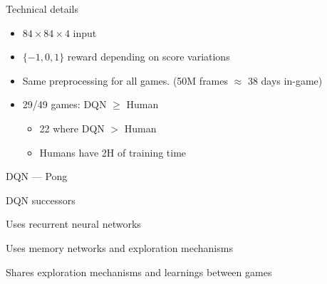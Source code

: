 \begin{frame}{Technical details}
  \begin{itemize}
  \item $84 \times 84 \times 4$ input
  \item $\{-1, 0, 1\}$ reward depending on score variations
  \item Same preprocessing for all games. (50M frames $\approx$ 38 days in-game)
  \item 29/49 games: DQN $\geq$ Human
    \begin{itemize}
    \item 22 where DQN $>$ Human
    \item Humans have 2H of training time
    \end{itemize}
  \end{itemize}
\end{frame}

\begin{frame}{DQN --- Pong}
\end{frame}

\begin{frame}{DQN successors}
  \begin{description}[<+->]
    \item[R2D2] Uses recurrent neural networks
    \item[Never Give Up] Uses memory networks and exploration mechanisms
    \item[Agent57] Shares exploration mechanisms and learnings between games
  \end{description}


\end{frame}
